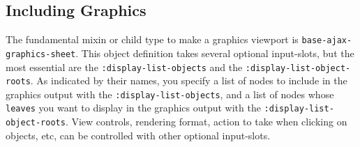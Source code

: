 \documentclass [11pt]{book}
\begin{document}
\subsection{Including Graphics}

\label{subsec:includinggraphics}



The fundamental mixin or child type to make a graphics viewport is \texttt{base-ajax-graphics-sheet}. This object definition takes several optional input-slots, but the most essential are the \texttt{:display-list-objects} and the \texttt{:display-list-object-roots}. As indicated by their names, you specify a list of nodes to include in
the graphics output with the \texttt{:display-list-objects}, and a list of nodes whose \texttt{leaves} you want to display in the graphics output with the \texttt{:display-list-object-roots}. View controls, rendering format, action to take when clicking on objects, etc, 
can be controlled with other optional input-slots.
\end{document}
